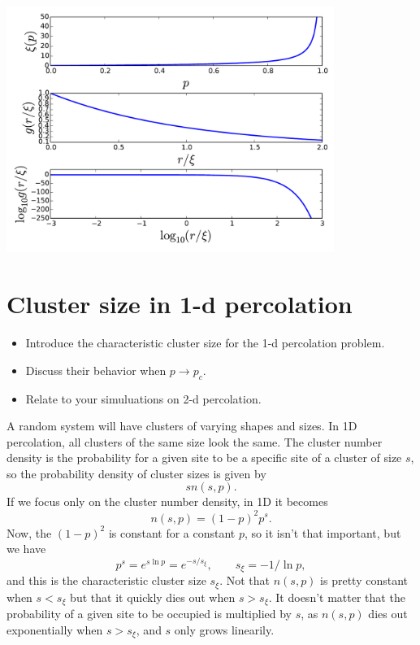 \documentclass[a4paper, 11pt, notitlepage, english]{article}
\begin{document}
\begin{center}
\includegraphics[width=0.8\textwidth]{13.pdf}
\end{center}


\clearpage


\section{Cluster size in 1-d percolation}
\begin{itemize}
	\item Introduce the characteristic cluster size for the 1-d percolation problem.
	\item Discuss their behavior when $p \to p_c$.
	\item Relate to your simuluations on 2-d percolation.
\end{itemize}


A random system will have clusters of varying shapes and sizes. In 1D percolation, all clusters of the same size look the same. The cluster number density is the probability for a given site to be a specific site of a cluster of size $s$, so the probability density of cluster sizes is given by
$$sn(s,p).$$
If we focus only on the cluster number density, in 1D it becomes
$$n(s,p) = (1-p)^2 p^s.$$
Now, the $(1-p)^2$ is constant for a constant $p$, so it isn't that important, but we have
$$p^s = e^{s \ln p} = e^{-s/s_\xi}, \qquad s_\xi = -1/\ln p,$$
and this is the characteristic cluster size $s_\xi$. Not that $n(s,p)$ is pretty constant when $s < s_\xi$ but that it quickly dies out when $s > s_\xi$. It doesn't matter that the probability of a given site to be occupied is multiplied by $s$, as $n(s,p)$ dies out exponentially when $s > s_\xi$, and $s$ only grows linearily.
\end{document}
